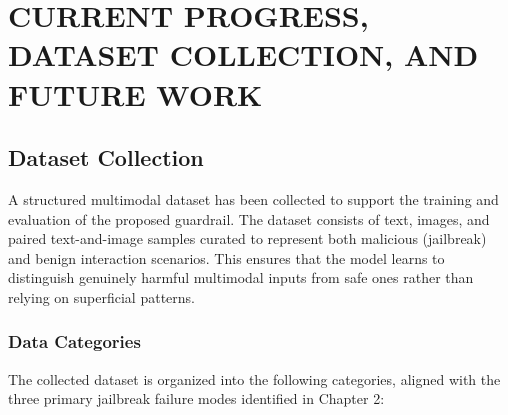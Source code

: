 \chapter{CURRENT PROGRESS, DATASET COLLECTION, AND FUTURE WORK}

\section{Dataset Collection}

A structured multimodal dataset has been collected to support the training and
evaluation of the proposed guardrail. The dataset consists of text, images,
and paired text-and-image samples curated to represent both malicious
(jailbreak) and benign interaction scenarios. This ensures that the model
learns to distinguish genuinely harmful multimodal inputs from safe ones
rather than relying on superficial patterns.

\subsection{Data Categories}

The collected dataset is organized into the following categories, aligned with
the three primary jailbreak failure modes identified in Chapter 2:

